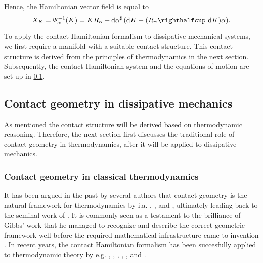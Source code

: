 Hence, the Hamiltonian vector field is equal to
\begin{equation}
    X_K = \Psi^{-1}_\alpha(K) = K R_\alpha + \fromDual{\dd{\alpha}}\qty(\dd{K} - (\intpr{R_\alpha}{\dd{K}})\alpha).
    \label{eq:contact_hamiltonian_vf}
\end{equation}

To apply the contact Hamiltonian formalism to dissipative mechanical systems, we first require a manifold with a suitable contact structure. This contact structure is derived from the principles of thermodynamics in the next section. Subsequently, the contact Hamiltonian system and the equations of motion are set up in \cref{ssec:contact_dissipation}.


\subsection{Contact geometry in dissipative mechanics}
\label{ssec:contact_dissipation}
As mentioned the contact structure will be derived based on thermodynamic reasoning. Therefore, the next section first discusses the traditional role of contact geometry in thermodynamics, after it will be applied to dissipative mechanics.

\subsubsection{Contact geometry in classical thermodynamics}
It has been argued in the past by several authors that contact geometry is the natural framework for thermodynamics by i.a. \citet{Arnold1991,Arnold1989a,Arnold1989,Arnold1989b}, \citet{Bamberg1988}, \citet{Burke1985} and \citet{Hermann1973}, ultimately leading back to the seminal work of \citet{Gibbs1873}. It is commonly seen as a testament to the brilliance of Gibbs' work that he managed to recognize and describe the correct geometric framework well before the required mathematical infrastructure came to invention \cite{Wightman1979}. In recent years, the contact Hamiltonian formalism has been succesfully applied to thermodynamic theory by e.g. \citet{Mrugala1991,Mrugala2000,Mrugala1984,Mrugala1985,Mrugala1993,Mrugala1996}, \citet{Balian2001}, \citet{VanderSchaft2021a,VanderSchaft2018}, \citet{Maschke2018}, \citet{Bravetti2015}, and \citet{Simoes2020}. 

